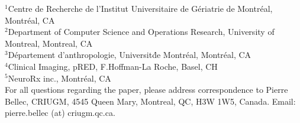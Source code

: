 \documentclass[authoryear]{elsarticle}
\begin{document}
$^1$Centre de Recherche de l'Institut Universitaire de G\'eriatrie de Montr\'eal, Montr\'eal, CA\\
$^2$Department of Computer Science and Operations Research, University of Montreal, Montreal, CA\\
$^3$D\'epartement d'anthropologie, Universit\' de Montr\'eal, Montr\'eal, CA\\
$^4$Clinical Imaging, pRED, F.Hoffman-La Roche, Basel, CH\\
$^5$NeuroRx inc., Montr\'eal, CA\\

For all questions regarding the paper, please address correspondence to Pierre Bellec, CRIUGM, 4545 Queen Mary, Montreal, QC, H3W 1W5, Canada. Email: pierre.bellec (at) criugm.qc.ca.\\
\end{document}
